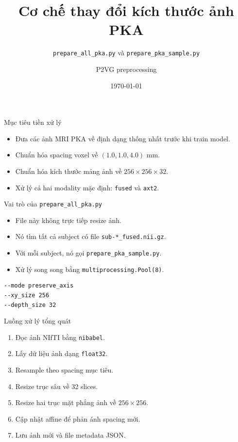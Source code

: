 \documentclass[aspectratio=169]{beamer}
\title{Cơ chế thay đổi kích thước ảnh PKA}
\subtitle{\texttt{prepare\_all\_pka.py} và \texttt{prepare\_pka\_sample.py}}
\author{P2VG preprocessing}
\date{\today}
\begin{document}
\begin{frame}
  \titlepage
\end{frame}

\begin{frame}{Mục tiêu tiền xử lý}
  \begin{itemize}
    \item Đưa các ảnh MRI PKA về định dạng thống nhất trước khi train model.
    \item Chuẩn hóa spacing voxel về \((1.0, 1.0, 4.0)\) mm.
    \item Chuẩn hóa kích thước mảng ảnh về \(256 \times 256 \times 32\).
    \item Xử lý cả hai modality mặc định: \texttt{fused} và \texttt{axt2}.
  \end{itemize}
\end{frame}

\begin{frame}{Vai trò của \texttt{prepare\_all\_pka.py}}
  \begin{itemize}
    \item File này không trực tiếp resize ảnh.
    \item Nó tìm tất cả subject có file \texttt{sub-*\_fused.nii.gz}.
    \item Với mỗi subject, nó gọi \texttt{prepare\_pka\_sample.py}.
    \item Xử lý song song bằng \texttt{multiprocessing.Pool(8)}.
  \end{itemize}

  \vspace{0.4cm}
  \begin{lstlisting}
--mode preserve_axis
--xy_size 256
--depth_size 32
  \end{lstlisting}
\end{frame}

\begin{frame}{Luồng xử lý tổng quát}
  \begin{enumerate}
    \item Đọc ảnh NIfTI bằng \texttt{nibabel}.
    \item Lấy dữ liệu ảnh dạng \texttt{float32}.
    \item Resample theo spacing mục tiêu.
    \item Resize trục sâu về 32 slices.
    \item Resize hai trục mặt phẳng ảnh về \(256 \times 256\).
    \item Cập nhật affine để phản ánh spacing mới.
    \item Lưu ảnh mới và file metadata JSON.
  \end{enumerate}
\end{frame}
\end{document}
